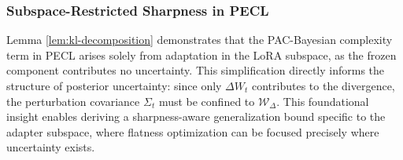 \documentclass{article} %
\newtheorem{lemma}{Lemma}
\begin{document}








   

\subsubsection{Subspace-Restricted Sharpness in PECL}

Lemma \ref{lem:kl-decomposition} demonstrates that the PAC-Bayesian complexity term in PECL arises solely from adaptation in the LoRA subspace, as the frozen component contributes no uncertainty. This simplification directly informs the structure of posterior uncertainty: since only $\Delta W_t$ contributes to the divergence, the perturbation covariance $\Sigma_t$ must be confined to $\mathcal{W}_\Delta$. This foundational insight enables deriving a sharpness-aware generalization bound specific to the adapter subspace, where flatness optimization can be focused precisely where uncertainty exists.
\end{document}
